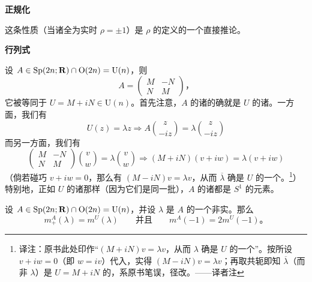 \par\nopagebreak
\textbf{正规化}\nopagebreak

这条性质（当诸\trEigenvalue{}全为实时 $\rho=\pm1$）是 $\rho$ 的定义的一个直接推论。\noqed

\par\nopagebreak
\textbf{行列式}\nopagebreak

设 $A\in\mathrm{Sp}(2n;\mathbf{R})\cap\mathrm{O}(2n)=\mathrm{U}(n)$，则
\[
A=\begin{pmatrix}M&-N\\N&M\end{pmatrix}\text{，}
\]
它被等同于 $U=M+iN\in\mathrm{U}(n)$。首先注意，$A$ 的诸\trEigenvalue{}的确就是 $U$ 的诸\trEigenvalue。一方面，我们有
\[
U(z)=\lambda z\Longrightarrow A\binom{z}{-iz}=\lambda\binom{z}{-iz}
\]
而另一方面，我们有
\[
\begin{pmatrix}M&-N\\N&M\end{pmatrix}\binom{v}{w}=\lambda\binom{v}{w}
\Longrightarrow(M+iN)(v+iw)=\lambda(v+iw)
\]
（倘若碰巧 $v+iw=0$，那么有 $(M-iN)v=\lambda v$，从而 $\overline{\lambda}$ 确是 $U$ 的一个\trEigenvalue。\footnote{译注：原书此处印作“$(M+iN)v=\lambda v$，从而 $\lambda$ 确是 $U$ 的一个\trEigenvalue”。按所设 $v+iw=0$（即 $w=iv$）代入，实得 $(M-iN)v=\lambda v$；再取共轭即知 $\overline{\lambda}$（而非 $\lambda$）是 $U=M+iN$ 的\trEigenvalue，系原书笔误，径改。——译者注}）特别地，正如 $U$ 的诸\trEigenvalue{}那样（因为它们是同一批），$A$ 的诸\trEigenvalue{}都是 $S^1$ 的元素。

\begin{lemma}\label{thm:unitary-multiplicities}
设 $A\in\mathrm{Sp}(2n;\mathbf{R})\cap\mathrm{O}(2n)=\mathrm{U}(n)$，并设 $\lambda$ 是 $A$ 的一个非实\trEigenvalue。那么
\[
m^A_+(\lambda)=m^U(\lambda)\qquad\text{并且}\qquad m^A(-1)=2m^U(-1)\text{。}
\]
\end{lemma}

